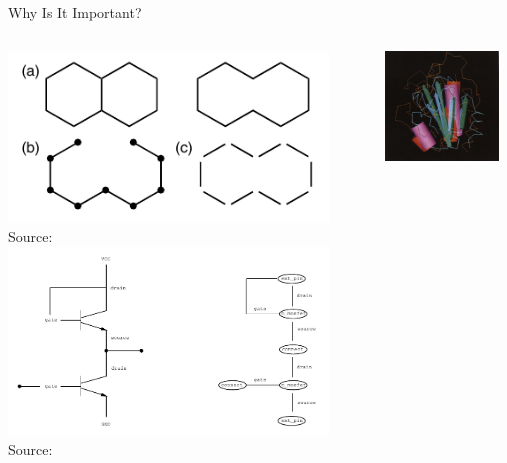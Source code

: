 \documentclass{beamer}
\begin{document}
\begin{frame}{Why Is It Important?}
  \begin{columns}[t]
    \begin{column}{0.5\textwidth}
      \centering
      \includegraphics[width=0.9\textwidth,height=0.4\textheight,keepaspectratio]{chemistry.png} \\[-7pt]
      {\tiny Source: \cite{WCMS:WCMS5}}
      \includegraphics[width=0.9\textwidth,height=0.4\textheight,keepaspectratio]{electronics.png} \\[-7pt]
      {\tiny Source: \cite{DBLP:journals/jair/CookH94}}
    \end{column}
    \begin{column}{0.5\textwidth}
      \centering
      \includegraphics[width=0.9\textwidth,height=0.4\textheight,keepaspectratio]{proteins.png} \\[-7pt]

\end{column}
\end{columns}
\end{frame}
\end{document}
